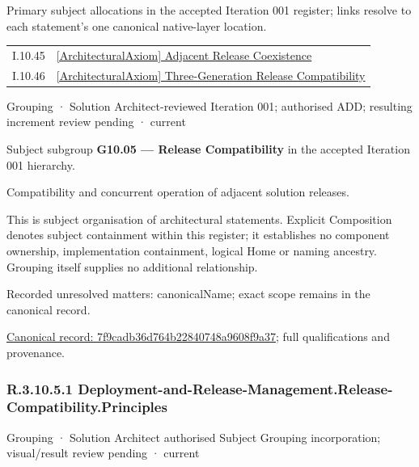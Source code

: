 Primary subject allocations in the accepted Iteration 001 register; links resolve to each statement’s one canonical native-layer location.\par
\begin{longtable}{p{.22\linewidth}p{.73\linewidth}}
I.10.45 & \hyperref[element:3ce5568f2ded498386fd6fcfb142f89a]{[ArchitecturalAxiom] Adjacent Release Coexistence} \\
I.10.46 & \hyperref[element:33d348c2936b401aa567d8fa531147ea]{[ArchitecturalAxiom] Three-Generation Release Compatibility} \\
\end{longtable}
\label{element:7f9cadb36d764b22840748a9608f9a37}
{\small Grouping · Solution Architect-reviewed Iteration 001; authorised ADD; resulting increment review pending · current}\par

Subject subgroup \textbf{G10.05 — Release Compatibility} in the accepted Iteration 001 hierarchy.



Compatibility and concurrent operation of adjacent solution releases.



This is subject organisation of architectural statements. Explicit Composition denotes subject containment within this register; it establishes no component ownership, implementation containment, logical Home or naming ancestry. Grouping itself supplies no additional relationship.


{\small Recorded unresolved matters: canonicalName; exact scope remains in the canonical record.}\par
{\footnotesize \href{../../../../continuum/grouping/7f9cadb36d764b22840748a9608f9a37.md}{Canonical record: 7f9cadb36d764b22840748a9608f9a37}; full qualifications and provenance.}\par
\subsubsection*{R.3.10.5.1 Deployment-and-Release-Management.Release-Compatibility.Principles}
\label{navigation:R.3.10.5.1}

\label{element:31812051912e4dd99b07125d86ca2c11}
{\small Grouping · Solution Architect authorised Subject Grouping incorporation; visual/result review pending · current}\par

